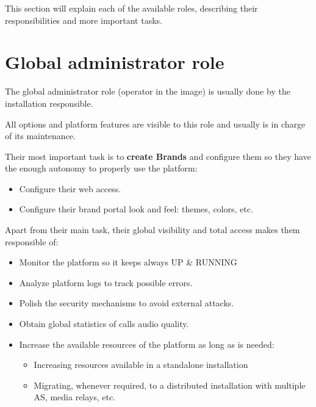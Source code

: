 \documentclass[letterpaper,10pt,english]{sphinxmanual}
\begin{document}
\noindent{}

This section will explain each of the available roles, describing their
responsibilities and more important tasks.


\section{Global administrator role}
\label{basic_concepts/operation_roles/index:global-administrator-role}
The global administrator role (operator in the image) is usually done by
the installation responsible.

All options and platform features are visible to this role and usually is
in charge of its maintenance.

Their most important task is to \textbf{create Brands} and configure them so
they have the enough autonomy to properly use the platform:
\begin{itemize}
\item {} 
Configure their web access.

\item {} 
Configure their brand portal look and feel: themes, colors, etc.

\end{itemize}

Apart from their main task, their global visibility and total access
makes them responsible of:
\begin{itemize}
\item {} 
Monitor the platform so it keeps always UP \& RUNNING

\item {} 
Analyze platform logs to track possible errors.

\item {} 
Polish the security mechanisms to avoid external attacks.

\item {} 
Obtain global statistics of calls audio quality.

\item {} 
Increase the available resources of the platform as long as is needed:
\begin{itemize}
\item {} 
Increasing resources available in a standalone installation

\item {} 
Migrating, whenever required, to a distributed installation with multiple
AS, media relays, etc.

\end{itemize}

\end{itemize}
\end{document}
